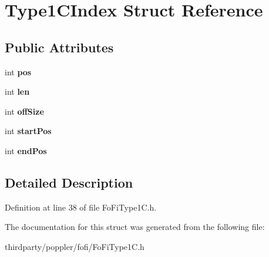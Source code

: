 \hypertarget{struct_type1_c_index}{}\section{Type1\+C\+Index Struct Reference}
\label{struct_type1_c_index}
\subsection*{Public Attributes}
\begin{DoxyCompactItemize}
\item 
\mbox{\label{struct_type1_c_index_a861562f87120a14b890596e3aa3bd1c6}} 
int {\bfseries pos}
\item 
\mbox{\label{struct_type1_c_index_acdee0a0fb146cf4704f2931571090b52}} 
int {\bfseries len}
\item 
\mbox{\label{struct_type1_c_index_a70ca6773e05aed9d843befb15bb8eb03}} 
int {\bfseries off\+Size}
\item 
\mbox{\label{struct_type1_c_index_aa73c99fd758dc6b323da26f32e1e7f2b}} 
int {\bfseries start\+Pos}
\item 
\mbox{\label{struct_type1_c_index_a63abb0ec2cc5851683bdcad3f31c34be}} 
int {\bfseries end\+Pos}
\end{DoxyCompactItemize}


\subsection{Detailed Description}


Definition at line 38 of file Fo\+Fi\+Type1\+C.\+h.



The documentation for this struct was generated from the following file\+:\begin{DoxyCompactItemize}
\item 
thirdparty/poppler/fofi/Fo\+Fi\+Type1\+C.\+h\end{DoxyCompactItemize}
